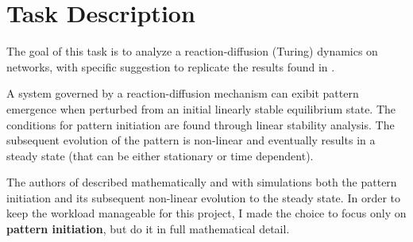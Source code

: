 \section{Task Description}
The goal of this task is to analyze a reaction-diffusion (Turing) dynamics on networks, with specific suggestion to replicate the results found in \cite{main_network}. 

A system governed by a reaction-diffusion mechanism can exibit pattern emergence when perturbed from an initial linearly stable equilibrium state. The conditions for pattern initiation are found through linear stability analysis. The subsequent evolution of the pattern is non-linear and eventually results in a steady state (that can be either stationary or time dependent).

The authors of \cite{main_network} described mathematically and with simulations both the pattern initiation and its subsequent non-linear evolution to the steady state. In order to keep the workload manageable for this project, I made the choice to focus only on \textbf{pattern initiation}, but do it in full mathematical detail.

